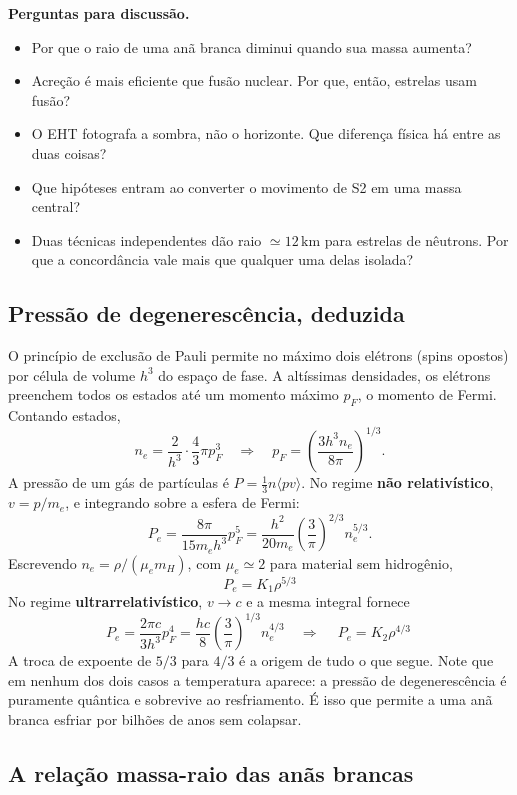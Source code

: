 \documentclass[11pt,a4paper]{article}
\begin{document}
\textbf{Perguntas para discussão.}
\begin{itemize}
\item Por que o raio de uma anã branca diminui quando sua massa aumenta?
\item Acreção é mais eficiente que fusão nuclear. Por que, então, estrelas usam fusão?
\item O EHT fotografa a sombra, não o horizonte. Que diferença física há entre as duas coisas?
\item Que hipóteses entram ao converter o movimento de S2 em uma massa central?
\item Duas técnicas independentes dão raio $\simeq12\,\mathrm{km}$ para estrelas de nêutrons. Por que a concordância vale mais que qualquer uma delas isolada?
\end{itemize}

\subsection*{Pressão de degenerescência, deduzida}

O princípio de exclusão de Pauli permite no máximo dois elétrons (spins opostos) por célula de volume $h^{3}$ do espaço de fase. A altíssimas densidades, os elétrons preenchem todos os estados até um momento máximo $p_F$, o momento de Fermi. Contando estados,
\[
n_e=\frac{2}{h^{3}}\cdot\frac{4}{3}\pi p_F^{3}
\quad\Longrightarrow\quad
p_F=\left(\frac{3h^{3}n_e}{8\pi}\right)^{1/3}.
\]
A pressão de um gás de partículas é $P=\frac{1}{3}n\langle pv\rangle$. No regime \textbf{não relativístico}, $v=p/m_e$, e integrando sobre a esfera de Fermi:
\[
P_e=\frac{8\pi}{15m_eh^{3}}p_F^{5}
=\frac{h^{2}}{20m_e}\left(\frac{3}{\pi}\right)^{2/3}n_e^{5/3}.
\]
Escrevendo $n_e=\rho/(\mu_em_H)$, com $\mu_e\simeq2$ para material sem hidrogênio,
\[
\boxed{\ P_e=K_1\rho^{5/3}\ }
\]
No regime \textbf{ultrarrelativístico}, $v\to c$ e a mesma integral fornece
\[
P_e=\frac{2\pi c}{3h^{3}}p_F^{4}
=\frac{hc}{8}\left(\frac{3}{\pi}\right)^{1/3}n_e^{4/3}
\quad\Longrightarrow\quad
\boxed{\ P_e=K_2\rho^{4/3}\ }
\]
A troca de expoente de $5/3$ para $4/3$ é a origem de tudo o que segue. Note que em nenhum dos dois casos a temperatura aparece: a pressão de degenerescência é puramente quântica e sobrevive ao resfriamento. É isso que permite a uma anã branca esfriar por bilhões de anos sem colapsar.

\subsection*{A relação massa-raio das anãs brancas}
\end{document}
